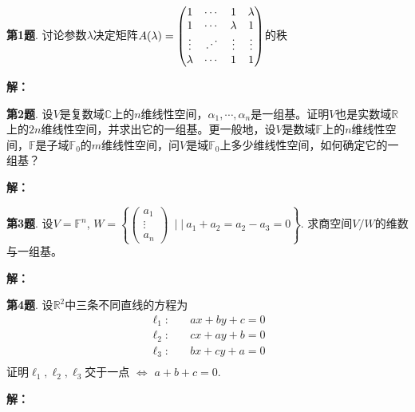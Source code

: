 
\renewcommand{\newpageorvspace}{\vspace{2em}}

\date{2021-11-12  第四次习题课}



\maketitle

{\bf 第1题}. 讨论参数$\lambda$决定矩阵$A(\lambda) = \begin{pmatrix} 1 & \cdots & 1 & \lambda \\ 1 & \cdots & \lambda & 1 \\ \vdots & \reflectbox{$\ddots$} & \vdots & \vdots \\ \lambda & \cdots & 1 & 1 \end{pmatrix}$的秩

{\bf 解：}


\newpageorvspace

{\bf 第2题}. 设$V$是复数域$\mathbb{C}$上的$n$维线性空间，$\alpha_1,\cdots,\alpha_n$是一组基。证明$V$也是实数域$\mathbb{R}$上的$2n$维线性空间，并求出它的一组基。更一般地，设$V$是数域$\mathbb{F}$上的$n$维线性空间，$\mathbb{F}$是子域$\mathbb{F}_0$的$m$维线性空间，问$V$是域$\mathbb{F}_0$上多少维线性空间，如何确定它的一组基？

{\bf 解：}


\newpageorvspace

{\bf 第3题}. 设$V = \mathbb{F}^n$, $W = \left\{ \begin{pmatrix} a_1 \\ \vdots \\ a_n \end{pmatrix} \ \mid|\ a_1+a_2=a_2-a_3=0 \right\}$. 求商空间$V / W$的维数与一组基。

{\bf 解：}


\newpageorvspace

{\bf 第4题}. 设$\mathbb{R}^2$中三条不同直线的方程为
\begin{align*}
    \ell_1: & \quad ax+by+c=0 \\
    \ell_2: & \quad cx+ay+b=0 \\
    \ell_3: & \quad bx+cy+a=0 \\
\end{align*}
证明$\ell_1,\ell_2,\ell_3$交于一点 $\Longleftrightarrow$ $a+b+c=0$.

{\bf 解：}



